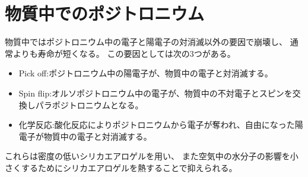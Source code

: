 \section{物質中でのポジトロニウム}

物質中ではポジトロニウム中の電子と陽電子の対消滅以外の要因で崩壊し、
通常よりも寿命が短くなる。
この要因としては次の3つがある。
\begin{itemize}
\item Pick off:ポジトロニウム中の陽電子が、物質中の電子と対消滅する。
\item Spin flip:オルソポジトロニウム中の電子が、物質中の不対電子とスピンを交換しパラポジトロニウムとなる。
\item 化学反応:酸化反応によりポジトロニウムから電子が奪われ、自由になった陽電子が物質中の電子と対消滅する。
\end{itemize}
これらは密度の低いシリカエアロゲルを用い、
また空気中の水分子の影響を小さくするためにシリカエアロゲルを熱することで抑えられる。

%